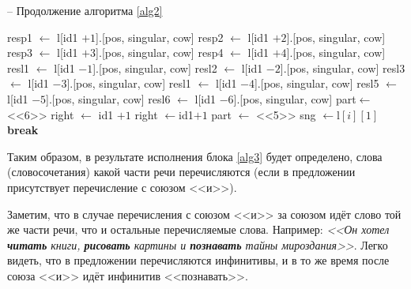 \documentclass[main]{subfiles}
\begin{document}
\begin{algorithm}
	\caption{-- Продолжение алгоритма \ref{alg2}}\label{alg3}
	\begin{algorithmic}[1]
		\State resp1 $\gets$ l[id1 $+ 1$].[pos, singular, cow] 
		\EndIf
		\State resp2 $\gets$ l[id1 $+ 2$].[pos, singular, cow]
		\EndIf	
		\State resp3 $\gets$ l[id1 $+ 3$].[pos, singular, cow] 
		\EndIf
		\State resp4 $\gets$ l[id1 $+ 4$].[pos, singular, cow]
		\EndIf
		\State resl1 $\gets$ l[id1 $-1$].[pos, singular, cow]
		\EndIf
		\State resl2 $\gets$ l[id1 $-2$].[pos, singular, cow]
		\EndIf
		\State resl3 $\gets$ l[id1 $-3$].[pos, singular, cow]
		\EndIf
		\State resl1 $\gets$ l[id1 $-4$].[pos, singular, cow]
		\EndIf
		\State resl5 $\gets$ l[id1 $-5$].[pos, singular, cow]
		\EndIf
		\State resl6 $\gets$ l[id1 $-6$].[pos, singular, cow]
		\EndIf
		 
		\State part$\gets$ <<6>>
		\State right $\gets$ id1 $+1$
				\EndIf
					\EndFor
					\State right $\gets$id1$ + 1$ 
					\State part $\gets$ <<5>>
					\State sng $\gets $l$[i][1]$ 
					\State \textbf{break}
							\EndIf
							\EndFor
									\EndIf
											\EndIf
	\end{algorithmic}
\end{algorithm}

Таким образом, в результате исполнения блока \ref{alg3} будет определено, слова (словосочетания) какой части речи перечисляются (если в предложении присутствует перечисление с союзом <<и>>).

Заметим, что в случае перечисления с союзом <<и>> за союзом идёт слово той же части речи, что и остальные перечисляемые слова. Например: \textit{<<Он хотел \textbf{читать} книги, \textbf{рисовать} картины и \textbf{познавать} тайны мироздания>>}. Легко видеть, что в предложении перечисляются инфинитивы, и в то же время после союза <<и>> идёт инфинитив <<познавать>>.
\end{document}
